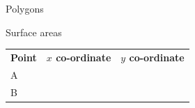 \begin{exercises}{Polygons}
\begin{exercises}{Surface areas }
\begin{figure}[H]
\begin{center}
      \vspace{2pt}
    \vspace{.1in}
    
    \end{center}

 \end{figure}   

    \addtocounter{footnote}{-0}
    
        \par 
        
    
          \begin{table}[H]
        
    
        \begin{center}
      
      \label{m39358*id70670}
      
    \noindent
      \tablelasttail{}
      \begin{xtabular}[t]{|l|l|l|}\hline
    
    
        
                  \textbf{Point}
                 &
    
    
        
                  \textbf{$x$ co-ordinate}
                 &
    
    
        
                  \textbf{$y$ co-ordinate}
     \tabularnewline{}
    
    
        A &
    
    
         &
    
    
     \tabularnewline{}
    
    
        B &
    
    
         &
    
    
     \tabularnewline{}
    

\end{xtabular}
\end{center}
\end{table}
\end{exercises}
\end{exercises}
